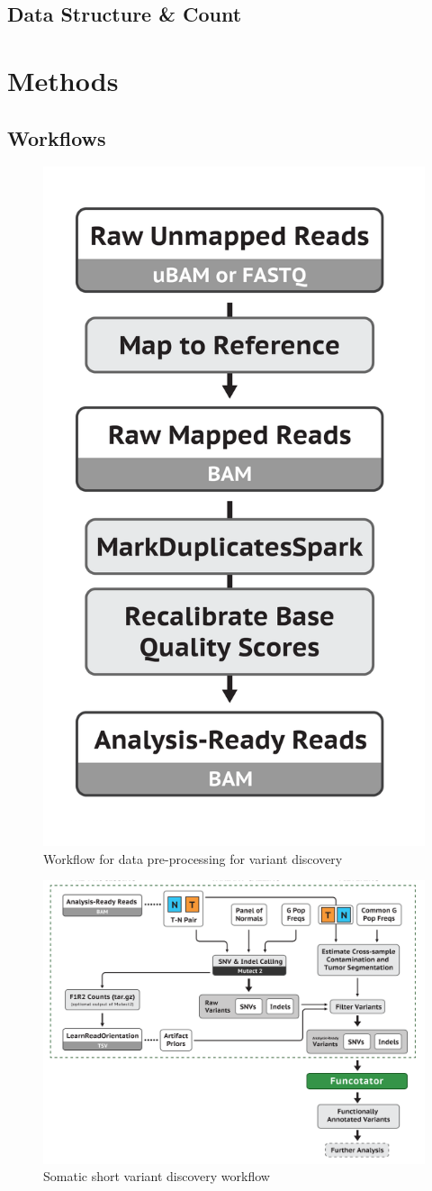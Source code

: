 \documentclass[a4paper]{article}
\begin{document}
        \subsection{Data Structure \& Count}

    \section{Methods}
        \subsection{Workflows}

            \begin{figure}[p]
                \centering
                \includegraphics[width=0.3 \linewidth]{figures/Workflow/mapping.png}
                \caption{Workflow for data pre-processing for variant discovery \protect\cite{gatk1, gatk2}}
                \label{fig:workflow-preprocessing}
            \end{figure}

            \begin{figure}[p]
                \centering
                \includegraphics[width=0.8 \linewidth]{figures/Workflow/somatic_short_variants.png}
                \caption{Somatic short variant discovery workflow \protect\cite{gatk1, gatk2}}
                \label{fig:workflow-somatic}
            \end{figure}
\end{document}
